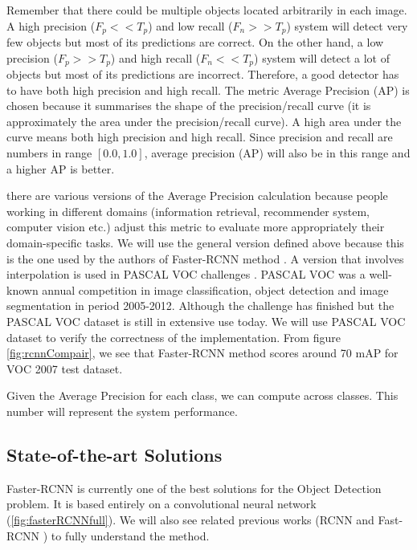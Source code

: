 Remember that there could be multiple objects located arbitrarily in each image. A high precision ($F_p << T_p$) and low recall ($F_n >> T_p$) system will detect very few objects but most of its predictions are correct. On the other hand, a low precision ($F_p >> T_p$) and high recall ($F_n << T_p$) system will detect a lot of objects but most of its predictions are incorrect. Therefore, a good detector has to have both high precision and high recall. The metric Average Precision (AP) is chosen because it summarises the shape of the precision/recall curve (it is approximately the area under the precision/recall curve). A high area under the curve means both high precision and high recall. Since precision and recall are numbers in range $[0.0, 1.0]$, average precision (AP) will also be in this range and a higher AP is better.

 there are various versions of the Average Precision calculation because people working in different domains (information retrieval, recommender system, computer vision etc.) adjust this metric to evaluate more appropriately their domain-specific tasks. We will use the general version defined above because this is the one used by the authors of Faster-RCNN method \cite{vocEval}. A version \cite{Everingham2010} that involves interpolation is used in PASCAL VOC challenges \cite{Everingham2010}. PASCAL VOC was a well-known annual competition in image classification, object detection and image segmentation in period 2005-2012. Although the challenge has finished but the PASCAL VOC dataset is still in extensive use today. We will use PASCAL VOC dataset to verify the correctness of the implementation. From figure \ref{fig:rcnnCompair}, we see that Faster-RCNN method scores around 70 mAP for VOC 2007 test dataset.

Given the Average Precision for each class, we can compute  across classes. This number will represent the system performance.

\subsection{State-of-the-art Solutions}
Faster-RCNN \cite{DBLP:journals/corr/RenHG015} is currently one of the best solutions for the Object Detection problem. It is based entirely on a convolutional neural network (\ref{fig:fasterRCNNfull}). We will also see related previous works (RCNN \cite{DBLP:journals/corr/GirshickDDM13} and Fast-RCNN \cite{DBLP:journals/corr/Girshick15}) to fully understand the method.

